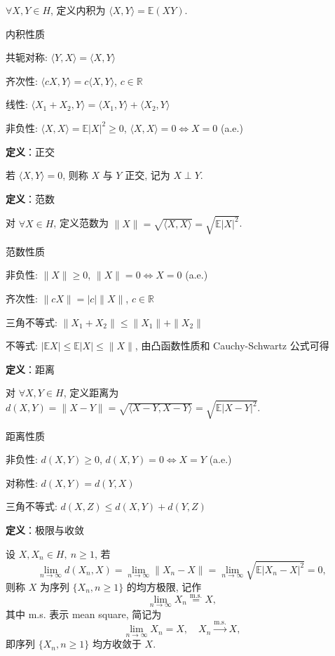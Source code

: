 \documentclass[openany]{ctexbook}
\theoremstyle{kaiti}
\theoremstyle{normal}
\begin{document}
$\forall X,Y\in H$, 定义内积为 $\langle X,Y\rangle=\mathbb{E}(XY)$.

内积性质

共轭对称: $\langle Y,X\rangle=\langle X,Y\rangle$

齐次性: $\langle cX,Y\rangle=c\langle X,Y\rangle$, $c\in\mathbb{R}$

线性: $\langle X_1+X_2,Y\rangle=\langle X_1,Y\rangle+\langle X_2,Y\rangle$

非负性: $\langle X,X\rangle=\mathbb{E}|X|^2\geqslant0$, $\langle X,X\rangle=0\Leftrightarrow X=0$ (a.e.)

\textbf{定义}：正交

若 $\langle X,Y\rangle=0$, 则称 $X$ 与 $Y$ 正交, 记为 $X\perp Y$.

\textbf{定义}：范数

对 $\forall X\in H$, 定义范数为 $\|X\|=\sqrt{\langle X,X\rangle}=\sqrt{\mathbb{E}|X|^2}$.

范数性质

非负性: $\|X\|\geqslant0$, $\|X\|=0\Leftrightarrow X=0$ (a.e.)

齐次性: $\|cX\|=|c|\|X\|$, $c\in\mathbb{R}$

三角不等式: $\|X_1+X_2\|\leqslant\|X_1\|+\|X_2\|$

不等式: $|\mathbb{E}X|\leqslant \mathbb{E}|X|\leqslant\|X\|$, 由凸函数性质和 Cauchy-Schwartz 公式可得

\textbf{定义}：距离

对 $\forall X,Y\in H$, 定义距离为 $d(X,Y)=\|X-Y\|=\sqrt{\langle X-Y,X-Y\rangle}=\sqrt{\mathbb{E}|X-Y|^2}$.

距离性质

非负性: $d(X,Y)\geqslant0$, $d(X,Y)=0\Leftrightarrow X=Y$ (a.e.)

对称性: $d(X,Y)=d(Y,X)$

三角不等式: $d(X,Z)\leqslant d(X,Y)+d(Y,Z)$

\textbf{定义}：极限与收敛

设 $X,X_n\in H,~n\geqslant1$, 若
\begin{equation}
  \lim_{n\to\infty}d(X_n,X)=\lim_{n\to\infty}\|X_n-X\|=\lim_{n\to\infty}\sqrt{\mathbb{E}|X_n-X|^2}=0,
\end{equation}
则称 $X$ 为序列 $\{X_n,n\geqslant1\}$ 的均方极限, 记作
\begin{equation}
  \lim_{n\to\infty}X_n\overset{\mathrm{m.s.}}{=}X,
\end{equation}
其中 m.s. 表示 mean square, 简记为
\begin{equation}
  \lim_{n\to\infty}X_n=X,\quad X_n\overset{\mathrm{m.s.}}{\rightarrow}X,
\end{equation}
即序列 $\{X_n,n\geqslant1\}$ 均方收敛于 $X$.
\end{document}
